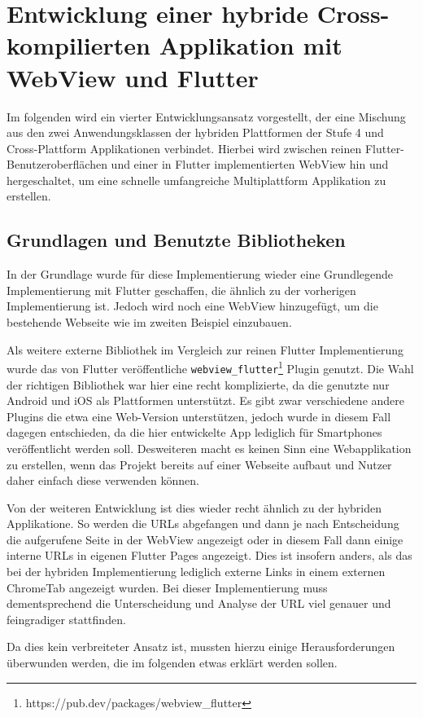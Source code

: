 \section{Entwicklung einer hybride Cross-kompilierten Applikation mit WebView und Flutter}
Im folgenden wird ein vierter Entwicklungsansatz vorgestellt, der eine Mischung aus den zwei Anwendungsklassen der hybriden Plattformen der Stufe 4 und Cross-Plattform Applikationen verbindet. Hierbei wird zwischen reinen Flutter-Benutzeroberflächen und einer in Flutter implementierten WebView hin und hergeschaltet, um eine schnelle umfangreiche Multiplattform Applikation zu erstellen.

\subsection{Grundlagen und Benutzte Bibliotheken}
In der Grundlage wurde für diese Implementierung wieder eine Grundlegende Implementierung mit Flutter geschaffen, die ähnlich zu der vorherigen Implementierung ist. Jedoch wird noch eine WebView hinzugefügt, um die bestehende Webseite wie im zweiten Beispiel einzubauen.  

Als weitere externe Bibliothek im Vergleich zur reinen Flutter Implementierung wurde das von Flutter veröffentliche \verb|webview_flutter|\footnote{https://pub.dev/packages/webview\_flutter} Plugin genutzt. Die Wahl der richtigen Bibliothek war hier eine recht komplizierte, da die genutzte nur Android und iOS als Plattformen unterstützt. Es gibt zwar verschiedene andere Plugins die etwa eine Web-Version unterstützen, jedoch wurde in diesem Fall dagegen entschieden, da die hier entwickelte App lediglich für Smartphones veröffentlicht werden soll. Desweiteren macht es keinen Sinn eine Webapplikation zu erstellen, wenn das Projekt bereits auf einer Webseite aufbaut und Nutzer daher einfach diese verwenden können.

Von der weiteren Entwicklung ist dies wieder recht ähnlich zu der hybriden Applikatione. So werden die URLs abgefangen und dann je nach Entscheidung die aufgerufene Seite in der WebView angezeigt oder in diesem Fall dann einige interne URLs in eigenen Flutter Pages angezeigt. Dies ist insofern anders, als das bei der hybriden Implementierung lediglich externe Links in einem externen ChromeTab angezeigt wurden. Bei dieser Implementierung muss dementsprechend die Unterscheidung und Analyse der URL viel genauer und feingradiger stattfinden.


Da dies kein verbreiteter Ansatz ist, mussten hierzu einige Herausforderungen überwunden werden, die im folgenden etwas erklärt werden sollen. 

